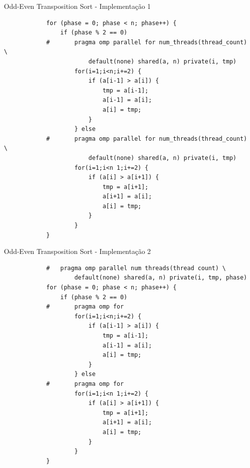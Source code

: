 	\begin{frame}[fragile]{Odd-Even Transposition Sort - Implementação 1}
		\begin{verbatim}
			for (phase = 0; phase < n; phase++) { 
				if (phase % 2 == 0)
			#		pragma omp parallel for num_threads(thread_count) \ 
						default(none) shared(a, n) private(i, tmp)
					for(i=1;i<n;i+=2) { 
						if (a[i-1] > a[i]) {
							tmp = a[i-1]; 
							a[i-1] = a[i]; 
							a[i] = tmp;
						} 
					} else
			#		pragma omp parallel for num_threads(thread_count) \
						default(none) shared(a, n) private(i, tmp) 
					for(i=1;i<n 1;i+=2) {
						if (a[i] > a[i+1]) { 
							tmp = a[i+1]; 
							a[i+1] = a[i]; 
							a[i] = tmp;
						}
					}
			} 
		\end{verbatim}
\end{frame}


	\begin{frame}[fragile]{Odd-Even Transposition Sort - Implementação 2}
		\begin{verbatim}
			# 	pragma omp parallel num threads(thread count) \ 
					default(none) shared(a, n) private(i, tmp, phase)
			for (phase = 0; phase < n; phase++) { 
				if (phase % 2 == 0)
			#		pragma omp for
					for(i=1;i<n;i+=2) { 
						if (a[i-1] > a[i]) {
							tmp = a[i-1]; 
							a[i-1] = a[i]; 
							a[i] = tmp;
						} 
					} else
			#		pragma omp for
					for(i=1;i<n 1;i+=2) {
						if (a[i] > a[i+1]) { 
							tmp = a[i+1]; 
							a[i+1] = a[i]; 
							a[i] = tmp;
						}
					}
			} 
		\end{verbatim}
\end{frame}


